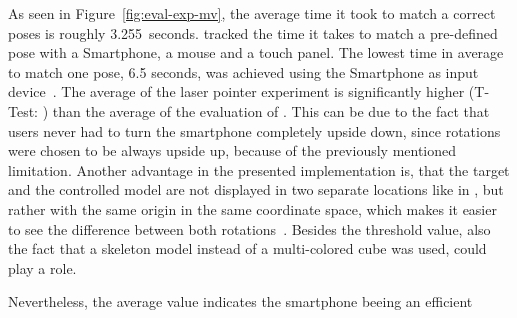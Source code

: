 \newcommand{\evalExpMvAvgPoses}{3.255} %
\newcommand{\evalExpMvStdPoses}{2.284}
\newcommand{\evalExpMvParticipants}{12}


As seen in Figure~\ref{fig:eval-exp-mv}, the average time it took to match a correct poses is roughly \evalExpMvAvgPoses\ seconds. \citeauthor{Katzakis.2010} tracked the time it takes to match a pre-defined pose with a Smartphone, a mouse and a touch panel. The lowest time in average to match one pose, 6.5 seconds, was achieved using the Smartphone as input device~\cite[140]{Katzakis.2010}. The average of the laser pointer experiment is significantly higher (T-Test: ) than the average of the evaluation of \citeauthor{Katzakis.2010}. This can be due to the fact that users never had to turn the smartphone completely upside down, since rotations were chosen to be always upside up, because of the previously mentioned limitation. Another advantage in the presented implementation is, that the target and the controlled model are not displayed in two separate locations like in {}, but rather with the same origin in the same coordinate space, which makes it easier to see the difference between both rotations~\cite[140]{Katzakis.2010}. Besides the threshold value, also the fact that a skeleton model instead of a multi-colored cube was used, could play a role. 

Nevertheless, the average value indicates the smartphone beeing an efficient 

